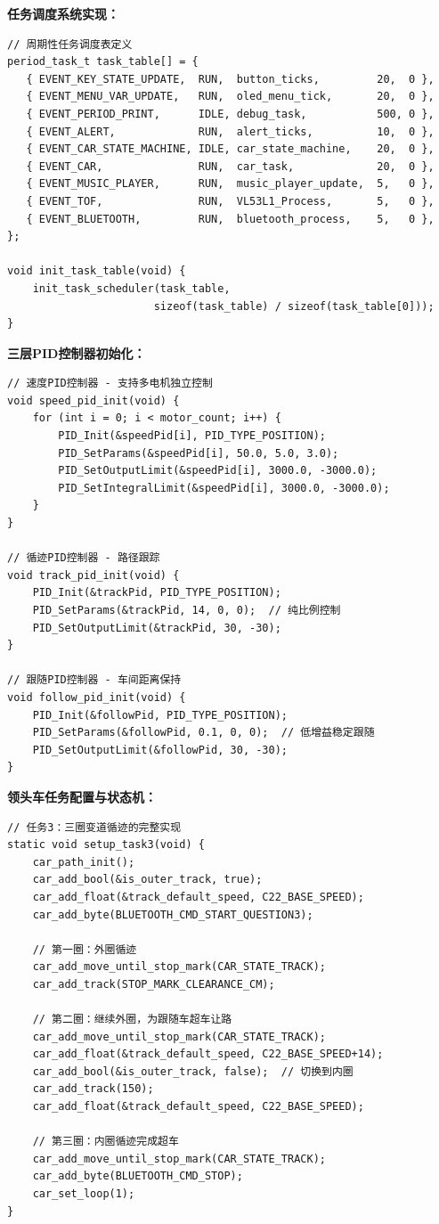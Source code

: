 \documentclass[UTF8]{ctexart}
\begin{document}
\textbf{任务调度系统实现：}

\begin{verbatim}
// 周期性任务调度表定义
period_task_t task_table[] = {
   { EVENT_KEY_STATE_UPDATE,  RUN,  button_ticks,         20,  0 },
   { EVENT_MENU_VAR_UPDATE,   RUN,  oled_menu_tick,       20,  0 },
   { EVENT_PERIOD_PRINT,      IDLE, debug_task,           500, 0 },
   { EVENT_ALERT,             RUN,  alert_ticks,          10,  0 },
   { EVENT_CAR_STATE_MACHINE, IDLE, car_state_machine,    20,  0 },
   { EVENT_CAR,               RUN,  car_task,             20,  0 },
   { EVENT_MUSIC_PLAYER,      RUN,  music_player_update,  5,   0 },
   { EVENT_TOF,               RUN,  VL53L1_Process,       5,   0 },
   { EVENT_BLUETOOTH,         RUN,  bluetooth_process,    5,   0 },
};

void init_task_table(void) {
    init_task_scheduler(task_table, 
                       sizeof(task_table) / sizeof(task_table[0]));
}
\end{verbatim}

\textbf{三层PID控制器初始化：}

\begin{verbatim}
// 速度PID控制器 - 支持多电机独立控制
void speed_pid_init(void) {
    for (int i = 0; i < motor_count; i++) {
        PID_Init(&speedPid[i], PID_TYPE_POSITION);    
        PID_SetParams(&speedPid[i], 50.0, 5.0, 3.0);    
        PID_SetOutputLimit(&speedPid[i], 3000.0, -3000.0); 
        PID_SetIntegralLimit(&speedPid[i], 3000.0, -3000.0); 
    }
}

// 循迹PID控制器 - 路径跟踪
void track_pid_init(void) {
    PID_Init(&trackPid, PID_TYPE_POSITION);
    PID_SetParams(&trackPid, 14, 0, 0);  // 纯比例控制
    PID_SetOutputLimit(&trackPid, 30, -30);
}

// 跟随PID控制器 - 车间距离保持
void follow_pid_init(void) {
    PID_Init(&followPid, PID_TYPE_POSITION);
    PID_SetParams(&followPid, 0.1, 0, 0);  // 低增益稳定跟随
    PID_SetOutputLimit(&followPid, 30, -30);
}
\end{verbatim}

\textbf{领头车任务配置与状态机：}

\begin{verbatim}
// 任务3：三圈变道循迹的完整实现
static void setup_task3(void) {
    car_path_init();
    car_add_bool(&is_outer_track, true);
    car_add_float(&track_default_speed, C22_BASE_SPEED);
    car_add_byte(BLUETOOTH_CMD_START_QUESTION3);
    
    // 第一圈：外圈循迹
    car_add_move_until_stop_mark(CAR_STATE_TRACK);
    car_add_track(STOP_MARK_CLEARANCE_CM);
    
    // 第二圈：继续外圈，为跟随车超车让路
    car_add_move_until_stop_mark(CAR_STATE_TRACK);
    car_add_float(&track_default_speed, C22_BASE_SPEED+14);
    car_add_bool(&is_outer_track, false);  // 切换到内圈
    car_add_track(150);
    car_add_float(&track_default_speed, C22_BASE_SPEED);
    
    // 第三圈：内圈循迹完成超车
    car_add_move_until_stop_mark(CAR_STATE_TRACK);
    car_add_byte(BLUETOOTH_CMD_STOP);
    car_set_loop(1);
}
\end{verbatim}
\end{document}
